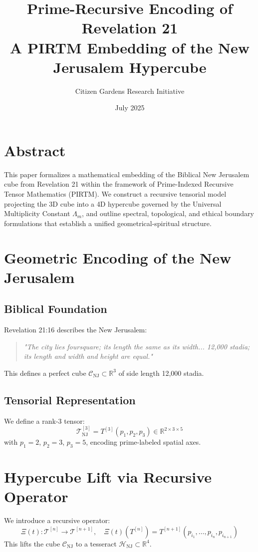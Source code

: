 \documentclass[12pt]{article}
\title{Prime-Recursive Encoding of Revelation 21\\A PIRTM Embedding of the New Jerusalem Hypercube}
\author{Citizen Gardens Research Initiative}
\date{July 2025}
\begin{document}
\maketitle

\section*{Abstract}
This paper formalizes a mathematical embedding of the Biblical New Jerusalem cube from Revelation 21 within the framework of Prime-Indexed Recursive Tensor Mathematics (PIRTM). We construct a recursive tensorial model projecting the 3D cube into a 4D hypercube governed by the Universal Multiplicity Constant $\Lambda_m$, and outline spectral, topological, and ethical boundary formulations that establish a unified geometrical-spiritual structure.

\section{Geometric Encoding of the New Jerusalem}

\subsection{Biblical Foundation}
Revelation 21:16 describes the New Jerusalem:
\begin{quote}
    \textit{"The city lies foursquare; its length the same as its width... 12,000 stadia; its length and width and height are equal."}
\end{quote}
This defines a perfect cube $\mathcal{C}_{\text{NJ}} \subset \mathbb{R}^3$ of side length 12,000 stadia.

\subsection{Tensorial Representation}
We define a rank-3 tensor:
\[ \mathcal{T}_{\text{NJ}}^{[3]} = T^{[3]}(p_1, p_2, p_3) \in \mathbb{R}^{2 \times 3 \times 5} \]
with $p_1 = 2$, $p_2 = 3$, $p_3 = 5$, encoding prime-labeled spatial axes.

\section{Hypercube Lift via Recursive Operator}
We introduce a recursive operator:
\[ \Xi(t): \mathcal{T}^{[n]} \to \mathcal{T}^{[n+1]}, \quad \Xi(t)(T^{[n]}) = T^{[n+1]}(p_{i_1}, \dots, p_{i_n}, p_{i_{n+1}}) \]
This lifts the cube $\mathcal{C}_{\text{NJ}}$ to a tesseract $\mathcal{H}_{\text{NJ}} \subset \mathbb{R}^4$.
\end{document}
